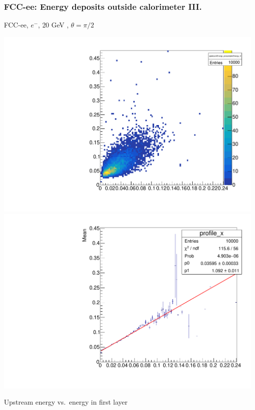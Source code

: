 \documentclass{beamer}
\newcommand{\redtext}[1]{%
  \textcolor{myRed}{#1}
}
\begin{document}
\begin{frame}
  \frametitle{FCC-ee: Energy deposits outside calorimeter III.}

  \centering
  FCC-ee, $e^{-}$, \redtext{20 GeV}, $\theta = \pi/2$ \\[1.5ex]
  \begin{adjustwidth}{-9mm}{-9mm}
    \includegraphics[width=0.49\linewidth]{figures/upstream/hist_upstream_vs_layer_0_90deg_20GeV.pdf}
    \includegraphics[width=0.49\linewidth]{figures/upstream/profile_upstream_vs_layer_0_90deg_20GeV.pdf}
  \end{adjustwidth}
  \redtext{Upstream} energy vs.\ energy in first layer
\end{frame}
\end{document}
